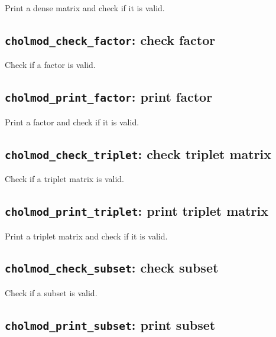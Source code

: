 \documentclass[11pt]{article}
\begin{document}

Print a dense matrix and check if it is valid.

\subsection{{\tt cholmod\_check\_factor}: check factor}


Check if a factor is valid.

\subsection{{\tt cholmod\_print\_factor}: print factor}


Print a factor and check if it is valid.

\subsection{{\tt cholmod\_check\_triplet}: check triplet matrix}


Check if a triplet matrix is valid.

\subsection{{\tt cholmod\_print\_triplet}: print triplet matrix}


Print a triplet matrix and check if it is valid.

\subsection{{\tt cholmod\_check\_subset}: check subset}


Check if a subset is valid.

\subsection{{\tt cholmod\_print\_subset}: print subset}
\end{document}

